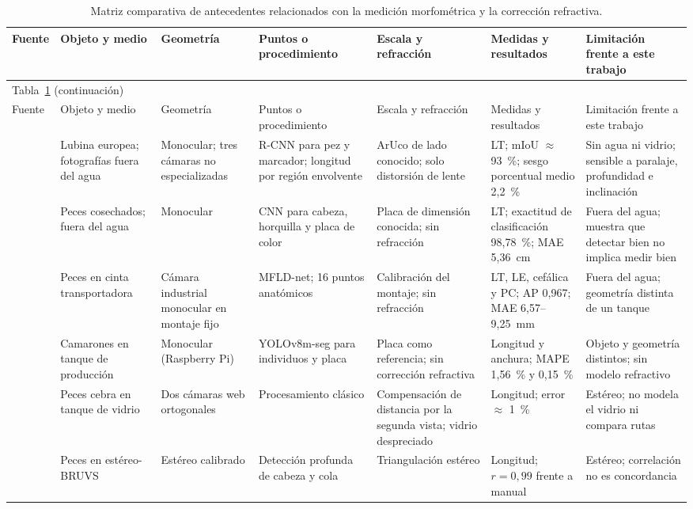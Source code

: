 \documentclass{report}
\begin{document}
\begin{longtable}{@{}p{2.2cm}p{2.8cm}p{2.6cm}p{3.0cm}p{3.0cm}p{3.2cm}p{3.6cm}@{}}
\caption{Matriz comparativa de antecedentes relacionados con la medición morfométrica y la corrección refractiva.}
\label{tab:antecedentes}\\
\hline
Fuente & Objeto y medio & Geometría & Puntos o procedimiento & Escala y refracción & Medidas y resultados & Limitación frente a este trabajo \\
\hline
\endfirsthead
\multicolumn{7}{l}{\small Tabla~\ref{tab:antecedentes} (continuación)}\\
\hline
Fuente & Objeto y medio & Geometría & Puntos o procedimiento & Escala y refracción & Medidas y resultados & Limitación frente a este trabajo \\
\hline
\endhead
\hline
\endfoot
\endlastfoot
\textcite{Monkman2019} & Lubina europea; fotografías fuera del agua & Monocular; tres cámaras no especializadas & R-CNN para pez y marcador; longitud por región envolvente & ArUco de lado conocido; solo distorsión de lente & LT; mIoU $\approx$ 93~\%; sesgo porcentual medio 2,2~\% & Sin agua ni vidrio; sensible a paralaje, profundidad e inclinación \\
\textcite{Tseng2020} & Peces cosechados; fuera del agua & Monocular & CNN para cabeza, horquilla y placa de color & Placa de dimensión conocida; sin refracción & LT; exactitud de clasificación 98,78~\%; MAE 5,36~cm & Fuera del agua; muestra que detectar bien no implica medir bien \\
\textcite{Saleh2023} & Peces en cinta transportadora & Cámara industrial monocular en montaje fijo & MFLD-net; 16 puntos anatómicos & Calibración del montaje; sin refracción & LT, LE, cefálica y PC; AP 0,967; MAE 6,57--9,25~mm & Fuera del agua; geometría distinta de un tanque \\
\textcite{Correia2025} & Camarones en tanque de producción & Monocular (Raspberry Pi) & YOLOv8m-seg para individuos y placa & Placa como referencia; sin corrección refractiva & Longitud y anchura; MAPE 1,56~\% y 0,15~\% & Objeto y geometría distintos; sin modelo refractivo \\
\textcite{AlJubouri2017} & Peces cebra en tanque de vidrio & Dos cámaras web ortogonales & Procesamiento clásico & Compensación de distancia por la segunda vista; vidrio despreciado & Longitud; error $\approx$ 1~\% & Estéreo; no modela el vidrio ni compara rutas \\
\textcite{Marrable2023} & Peces en estéreo-BRUVS & Estéreo calibrado & Detección profunda de cabeza y cola & Triangulación estéreo & Longitud; $r = 0{,}99$ frente a manual & Estéreo; correlación no es concordancia \\

\end{longtable}
\end{document}
